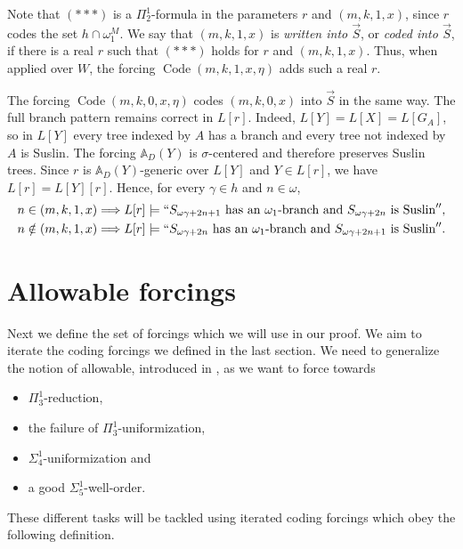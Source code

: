 \documentclass[a4paper,11pt]{article}
\begin{document}
     Note that $({\ast}{\ast}{\ast})$ is a $\Pi^1_2$-formula in the parameters $r$ and $(m,k,1,x)$, since $r$ codes the set $h\cap\omega_1^M$. We say that $(m,k,1,x)$ is \emph{written into $\vec S$}, or \emph{coded into $\vec S$}, if there is a real $r$ such that $({\ast}{\ast}{\ast})$ holds for $r$ and $(m,k,1,x)$. Thus, when applied over $W$, the forcing $\operatorname{Code}(m,k,1,x,\eta)$ adds such a real $r$.

     The forcing $\operatorname{Code}(m,k,0,x,\eta)$ codes $(m,k,0,x)$ into $\vec S$ in the same way. The full branch pattern remains correct in $L[r]$. Indeed, $L[Y]=L[X]=L[G_A]$, so in $L[Y]$ every tree indexed by $A$ has a branch and every tree not indexed by $A$ is Suslin. The forcing $\mathbb A_D(Y)$ is $\sigma$-centered and therefore preserves Suslin trees. Since $r$ is $\mathbb A_D(Y)$-generic over $L[Y]$ and $Y\in L[r]$, we have $L[r]=L[Y][r]$. Hence, for every $\gamma\in h$ and $n\in\omega$,
     \begin{align*}
     n\in(m,k,1,x)&\Longrightarrow L[r]\models ``S_{\omega\gamma+2n+1}\text{ has an $\omega_1$-branch and }S_{\omega\gamma+2n}\text{ is Suslin}'',\\
     n\notin(m,k,1,x)&\Longrightarrow L[r]\models ``S_{\omega\gamma+2n}\text{ has an $\omega_1$-branch and }S_{\omega\gamma+2n+1}\text{ is Suslin}''.
     \end{align*}

    \section{Allowable forcings}
    
    
    Next we define the set of forcings which we will use in our proof. We aim to iterate the coding forcings we defined in the last section. We need to generalize the notion of allowable, introduced in \cite{Reduction}, as  we  want to force towards 
\begin{itemize}
\item $\Pi^1_3$-reduction,
\item the failure of $\Pi^1_3$-uniformization,
\item $\Sigma^1_4$-uniformization and
\item a good $\Sigma^1_5$-well-order.
\end{itemize}
These different tasks will be tackled using iterated coding forcings which obey the following definition.
    
\end{document}

